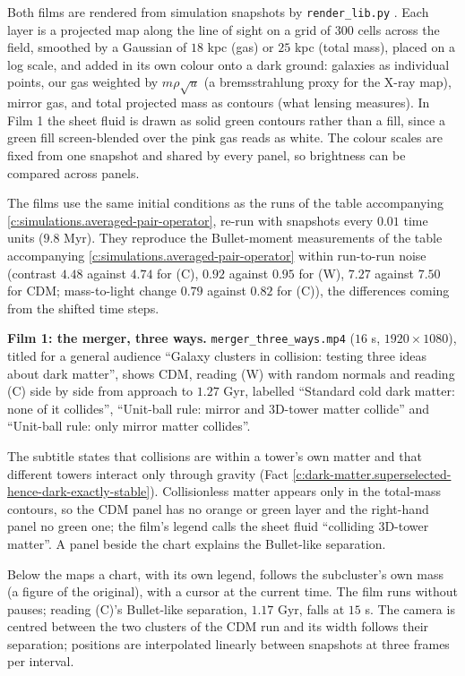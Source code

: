 \documentclass[11pt]{article}
\theoremstyle{definition}
\theoremstyle{plain}
\providecommand{\file}{}\renewcommand{\file}[1]{\texttt{#1}}
\begin{document}
\label{c:note.simulations.setting-films}
Both films are rendered from simulation snapshots by \file{render\_lib.py} \cite{ButlerSuppT14b}. Each layer is a projected map along the line of sight on a grid of $300$ cells across the field, smoothed by a Gaussian of $18$ kpc (gas) or $25$ kpc (total mass), placed on a log scale, and added in its own colour onto a dark ground: galaxies as individual points, our gas weighted by $m\rho\sqrt{u}$ (a bremsstrahlung proxy for the X-ray map), mirror gas, and total projected mass as contours (what lensing measures). In Film 1 the sheet fluid is drawn as solid green contours rather than a fill, since a green fill screen-blended over the pink gas reads as white. The colour scales are fixed from one snapshot and shared by every panel, so brightness can be compared across panels.

The films use the same initial conditions as the runs of the table accompanying \ref{c:simulations.averaged-pair-operator}, re-run with snapshots every $0.01$ time units ($9.8$ Myr). They reproduce the Bullet-moment measurements of the table accompanying \ref{c:simulations.averaged-pair-operator} within run-to-run noise (contrast $4.48$ against $4.74$ for (C), $0.92$ against $0.95$ for (W), $7.27$ against $7.50$ for CDM; mass-to-light change $0.79$ against $0.82$ for (C)), the differences coming from the shifted time steps.

\label{c:note.simulations.setting-films-2}
\textbf{Film 1: the merger, three ways.} \file{merger\_three\_ways.mp4} ($16$ s, $1920 \times 1080$), titled for a general audience ``Galaxy clusters in collision: testing three ideas about dark matter'', shows CDM, reading (W) with random normals and reading (C) side by side from approach to $1.27$ Gyr, labelled ``Standard cold dark matter: none of it collides'', ``Unit-ball rule: mirror and 3D-tower matter collide'' and ``Unit-ball rule: only mirror matter collides''.

The subtitle states that collisions are within a tower's own matter and that different towers interact only through gravity (Fact \ref{c:dark-matter.superselected-hence-dark-exactly-stable}). Collisionless matter appears only in the total-mass contours, so the CDM panel has no orange or green layer and the right-hand panel no green one; the film's legend calls the sheet fluid ``colliding 3D-tower matter''. A panel beside the chart explains the Bullet-like separation.

Below the maps a chart, with its own legend, follows the subcluster's own mass (a figure of the original), with a cursor at the current time. The film runs without pauses; reading (C)'s Bullet-like separation, $1.17$ Gyr, falls at $15$ s. The camera is centred between the two clusters of the CDM run and its width follows their separation; positions are interpolated linearly between snapshots at three frames per interval.
\end{document}
